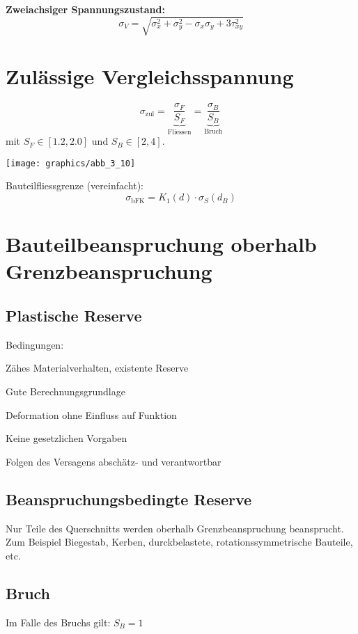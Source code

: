 	\textbf{Zweiachsiger Spannungszustand:}
	\begin{equation*}
		\sigma_V = \sqrt{\sigma_x^2 + \sigma_y^2 - \sigma_x\sigma_y + 3 \tau_{xy}^2}
	\end{equation*}
\section{Zulässige Vergleichsspannung} %
	\begin{equation*}
		\sigma_{\text{zul}} = \underbrace{\frac{\sigma_F}{S_F}}_{\text{Fliessen}} = \underbrace{\frac{\sigma_B}{S_B}}_{\text{Bruch}}
	\end{equation*}
	mit $S_F \in [1.2 , 2.0]$ und $S_B \in [2 , 4]$.

	\texttt{[image: graphics/abb\_3\_10]}
	
	Bauteilfliessgrenze (vereinfacht):
	\begin{equation*}
		\sigma_\text{bFK} = K_1(d)\cdot \sigma_S(d_B)
	\end{equation*}
\section{Bauteilbeanspruchung oberhalb Grenzbeanspruchung} %
	\subsection{Plastische Reserve} %
		Bedingungen:
		\begin{tightitemize}
			\item Zähes Materialverhalten, existente Reserve
			\item Gute Berechnungsgrundlage
			\item Deformation ohne Einfluss auf Funktion
			\item Keine gesetzlichen Vorgaben
			\item Folgen des Versagens abschätz- und verantwortbar
		\end{tightitemize}
	\subsection{Beanspruchungsbedingte Reserve} %
		Nur Teile des Querschnitts werden oberhalb Grenzbeanspruchung beansprucht. Zum Beispiel Biegestab, Kerben, durckbelastete, rotationssymmetrische Bauteile, etc.
	\subsection{Bruch} %
		Im Falle des Bruchs gilt: $S_B = 1$
